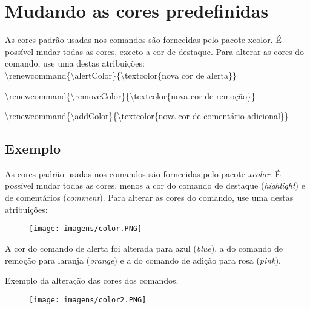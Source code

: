 \documentclass[12pt,openright,oneside,a4paper,sumario=tradicional,brazil]{abntex2}
\begin{document}
\section{Mudando as cores predefinidas}
As cores padrão usadas nos comandos são fornecidas pelo pacote xcolor. É possível mudar todas as cores, exceto a cor de destaque. Para alterar as cores do comando, use uma destas atribuições:\\

\textbackslash renewcommand\{\textbackslash alertColor\}\{\textbackslash textcolor\{nova cor de alerta\}\} 

\textbackslash renewcommand\{\textbackslash removeColor\}\{\textbackslash textcolor\{nova cor de remoção\}\} 

\textbackslash renewcommand\{\textbackslash addColor\}\{\textbackslash textcolor\{nova cor de comentário adicional\}\}

\subsection{Exemplo}
\justifying

As cores padrão usadas nos comandos são fornecidas pelo pacote \textit{xcolor}. É possível mudar todas as cores, menos a cor do comando de destaque (\textit{highlight}) e de comentários (\textit{comment}). Para alterar as cores do comando, use uma destas atribuições:

\begin{figure}[htp]
        \centering
        \texttt{[image: imagens/color.PNG]}
    \end{figure}

\noindent A cor do comando de alerta foi alterada para azul (\textit{blue}), a do comando de remoção para laranja (\textit{orange}) e a do comando de adição para rosa (\textit{pink}).

\newpage

\noindent Exemplo da alteração das cores dos comandos.

\begin{figure}[htp]
        \centering
        \texttt{[image: imagens/color2.PNG]}
    \end{figure}
\end{document}
